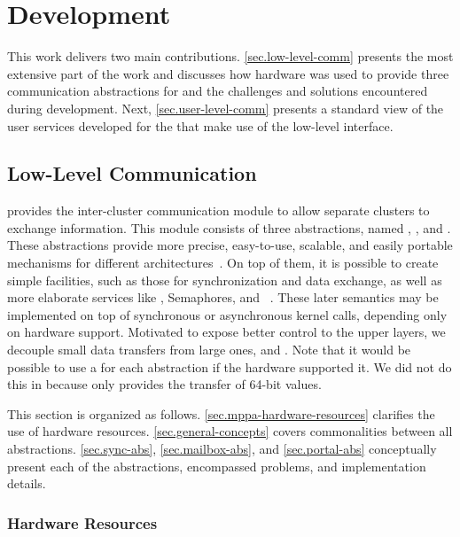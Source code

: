 \chapter{Development}
\label{ch.development}

	This work delivers two main contributions.
	\autoref{sec.low-level-comm} presents the most extensive part of the
	work and discusses how \mppa hardware was used to provide three communication abstractions for
	\textit{\nanvixhal} and the challenges and solutions encountered during development.
	Next, \autoref{sec.user-level-comm} presents a standard view of the user services
	developed for the \textit{\nanvixmicrokernel} that make use of the low-level interface.

	\section{Low-Level Communication}
	\label{sec.low-level-comm}

		\textit{\nanvixhal} provides the inter-cluster communication module to allow separate
		clusters to exchange information.
		This module consists of three abstractions, named \sync, \mailbox, and \portal.
		These abstractions provide more precise, easy-to-use, scalable, and easily
		portable mechanisms for different architectures~\cite{wentzlaff_fleets:_2011}.
		On top of them, it is possible to create simple
		facilities, such
		as those for synchronization and data exchange, as well as more elaborate services
		like \shm, \posix Semaphores, and \rmem~\cite{penna:rmen}.
		These later semantics may be implemented on top of synchronous
		or asynchronous kernel calls, depending only on hardware support.
		Motivated to expose better \qos control to the upper layers, we decouple small data
		transfers from large ones, \ie \mailbox and \portal.
		Note that it would be possible to use a \noc for each abstraction if the hardware supported it.
		We did not do this in \mppa because \cnoc only provides the transfer of 64-bit values.

		This section is organized as follows.
		\autoref{sec.mppa-hardware-resources} clarifies the use of \mppa hardware resources.
		\autoref{sec.general-concepts} covers commonalities between all abstractions.
		\autoref{sec.sync-abs},
		\autoref{sec.mailbox-abs}, and
		\autoref{sec.portal-abs}
		conceptually present each of the abstractions, encompassed problems, and
		implementation details.

		\subsection{\mppa Hardware Resources}
		\label{sec.mppa-hardware-resources}

